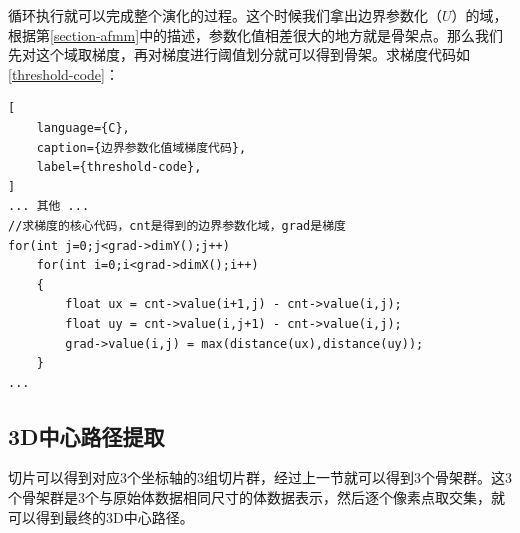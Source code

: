 循环执行就可以完成整个演化的过程。这个时候我们拿出边界参数化（$U$）的域，根据第\ref{section-afmm}中的描述，参数化值相差很大的地方就是骨架点。那么我们先对这个域取梯度，再对梯度进行阈值划分就可以得到骨架。求梯度代码如\ref{threshold-code}：
\begin{lstlisting}[
    language={C},
    caption={边界参数化值域梯度代码},
    label={threshold-code},
]
... 其他 ...
//求梯度的核心代码，cnt是得到的边界参数化域，grad是梯度
for(int j=0;j<grad->dimY();j++)	
    for(int i=0;i<grad->dimX();i++)
    {
        float ux = cnt->value(i+1,j) - cnt->value(i,j);
        float uy = cnt->value(i,j+1) - cnt->value(i,j);
        grad->value(i,j) = max(distance(ux),distance(uy));
    }
...
\end{lstlisting}


\subsection{3D中心路径提取}
切片可以得到对应3个坐标轴的3组切片群，经过上一节就可以得到3个骨架群。这3个骨架群是3个与原始体数据相同尺寸的体数据表示，然后逐个像素点取交集，就可以得到最终的3D中心路径。
